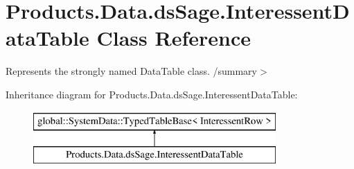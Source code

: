 \hypertarget{class_products_1_1_data_1_1ds_sage_1_1_interessent_data_table}{}\section{Products.\+Data.\+ds\+Sage.\+Interessent\+Data\+Table Class Reference}
\label{class_products_1_1_data_1_1ds_sage_1_1_interessent_data_table}


Represents the strongly named Data\+Table class. /summary$>$  


Inheritance diagram for Products.\+Data.\+ds\+Sage.\+Interessent\+Data\+Table\+:\begin{figure}[H]
\begin{center}
\leavevmode
\includegraphics[height=2.000000cm]{class_products_1_1_data_1_1ds_sage_1_1_interessent_data_table}
\end{center}
\end{figure}
